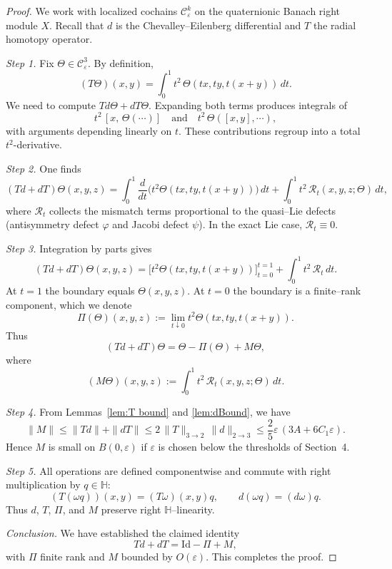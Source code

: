 \documentclass[10pt,a4paper]{amsart}
\begin{document}
\begin{proof}
We work with localized cochains $\mathcal C^k_\varepsilon$ on the quaternionic Banach right module $X$.
Recall that $d$ is the Chevalley--Eilenberg differential and $T$ the radial homotopy operator.

\smallskip
\emph{Step 1. }
Fix $\Theta\in\mathcal C^3_\varepsilon$. By definition,
\[
(T\Theta)(x,y)=\int_0^1 t^2\,\Theta(tx,ty,t(x+y))\,dt.
\]
We need to compute $Td\Theta+dT\Theta$. Expanding both terms produces integrals of
\[
t^2\,[x,\,\Theta(\cdots)]\quad \text{and}\quad t^2\,\Theta([x,y],\cdots),
\]
with arguments depending linearly on $t$. These contributions regroup into a total $t^{2}$-derivative.

\smallskip
\emph{Step 2.}
One finds
\[
(Td+dT)\Theta(x,y,z)=\int_0^1 \frac{d}{dt}\Big(t^2\Theta(tx,ty,t(x+y))\Big)\,dt
+\int_0^1 t^2\,\mathcal R_t(x,y,z;\Theta)\,dt,
\]
where $\mathcal R_t$ collects the mismatch terms proportional to the quasi--Lie defects
(antisymmetry defect $\varphi$ and Jacobi defect $\psi$). In the exact Lie case, $\mathcal R_t\equiv 0$.

\smallskip
\emph{Step 3.}
Integration by parts gives
\[
(Td+dT)\Theta(x,y,z)=\Big[t^2\Theta(tx,ty,t(x+y))\Big]_{t=0}^{t=1}
+\int_0^1 t^2\,\mathcal R_t\,dt.
\]
At $t=1$ the boundary equals $\Theta(x,y,z)$.
At $t=0$ the boundary is a finite--rank component, which we denote
\[
\Pi(\Theta)(x,y,z):=\lim_{t\downarrow 0}t^2\Theta(tx,ty,t(x+y)).
\]
Thus
\[
(Td+dT)\Theta=\Theta-\Pi(\Theta)+M\Theta,
\]
where
\[
(M\Theta)(x,y,z):=\int_0^1 t^2\,\mathcal R_t(x,y,z;\Theta)\,dt.
\]

\smallskip
\emph{Step 4.}
From Lemmas~\ref{lem:T bound} and \ref{lem:dBound}, we have
\[
\|M\|\le \|Td\|+\|dT\|\le 2\,\|T\|_{3\to2}\,\|d\|_{2\to3}
\le \frac{2}{5}\varepsilon\,(3A+6C_1\varepsilon).
\]
Hence $M$ is small on $B(0,\varepsilon)$ if $\varepsilon$ is chosen below the thresholds
of Section~4.

\smallskip
\emph{Step 5.}
All operations are defined componentwise and commute with right multiplication by $q\in\mathbb H$:
\[
(T(\omega q))(x,y)=(T\omega)(x,y)q,\qquad d(\omega q)=(d\omega)q.
\]
Thus $d$, $T$, $\Pi$, and $M$ preserve right $\mathbb H$--linearity.

\smallskip
\emph{Conclusion.}
We have established the claimed identity
\[
Td+dT=\mathrm{Id}-\Pi+M,
\]
with $\Pi$ finite rank and $M$ bounded by $O(\varepsilon)$.
This completes the proof.
\end{proof}
\end{document}
